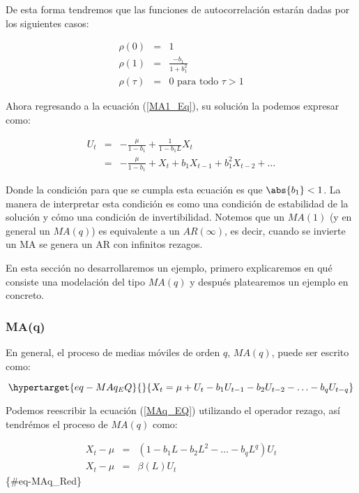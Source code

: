 \documentclass[
  a4paper,
]{article}
\begin{document}
De esta forma tendremos que las funciones de autocorrelación estarán
dadas por los siguientes casos:

\begin{eqnarray}
    \rho(0) & = & 1 \nonumber \\
    \rho(1) & = & \frac{- b_1}{1 + b_1^2} \nonumber \\
    \rho(\tau) & = & 0 \text{ para todo } \tau > 1 \nonumber 
\end{eqnarray}

Ahora regresando a la ecuación (\ref{MA1_Eq}), su solución la podemos
expresar como:

\begin{eqnarray}
    U_ t & = & - \frac{\mu}{1 - b_1} + \frac{1}{1 - b_1 L} X_t \nonumber \\
    & = & - \frac{\mu}{1 - b_1} + X_t + b_1 X_{t-1} + b_1^2 X_{t-2} + \ldots \nonumber
\end{eqnarray}

Donde la condición para que se cumpla esta ecuación es que
\(\abs{b_1} < 1\). La manera de interpretar esta condición es como una
condición de estabilidad de la solución y cómo una condición de
invertibilidad. Notemos que un \(MA(1)\) (y en general un \(MA(q)\)) es
equivalente a un \(AR(\infty)\), es decir, cuando se invierte un MA se
genera un AR con infinitos rezagos.

En esta sección no desarrollaremos un ejemplo, primero explicaremos en
qué consiste una modelación del tipo \(MA(q)\) y después platearemos un
ejemplo en concreto.

\hypertarget{maq}{%
\subsubsection{MA(q)}\label{maq}}

En general, el proceso de medias móviles de orden \(q\), \(MA(q)\),
puede ser escrito como:

\begin{equation}\protect\hypertarget{eq-MAq_EQ}{}{
X_t = \mu + U_t - b_1 U_{t-1} - b_2 U_{t-2} - \ldots - b_q U_{t-q}
}\label{eq-MAq_EQ}\end{equation}

Podemos reescribir la ecuación (\ref{MAq_EQ}) utilizando el operador
rezago, así tendrémos el proceso de \(MA(q)\) como:

\begin{eqnarray}
    X_t - \mu & = & (1 - b_1 L - b_2 L^2 - \ldots - b_q L^q) U_{t} \nonumber \\
    X_t - \mu & = & \beta(L) U_t
\end{eqnarray} \{\#eq-MAq\_Red\}
\end{document}
